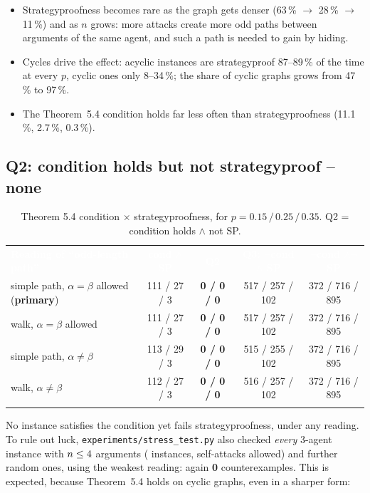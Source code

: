\documentclass[10pt,a4paper]{article}
\newcommand{\thd}[1]{\textcolor{white}{\sffamily\bfseries #1}}
\newcommand{\code}[1]{\textcolor{brand!85!black}{\texttt{#1}}}
\newcommand{\tabend}{\arrayrulecolor{brand}\specialrule{0.8pt}{0pt}{0pt}\arrayrulecolor{black}}
\begin{document}
\begin{keybox}[Q1 -- findings]
\begin{itemize}
  \item Strategyproofness becomes rare as the graph gets denser (63\,\% $\to$ 28\,\% $\to$ 11\,\%) and as $n$ grows: more
        attacks create more odd paths between arguments of the same agent, and such a path is needed to gain by hiding.
  \item Cycles drive the effect: acyclic instances are strategyproof 87--89\,\% of the time at every $p$, cyclic ones only
        8--34\,\%; the share of cyclic graphs grows from 47\,\% to 97\,\%.
  \item The Theorem~5.4 condition holds far less often than strategyproofness (11.1\,\%, 2.7\,\%, 0.3\,\%).
\end{itemize}
\end{keybox}

\subsection{Q2: condition holds but not strategyproof -- none}\label{sec:q2}

\begin{table}[H]\centering
\caption{Theorem 5.4 condition $\times$ strategyproofness, for $p = 0.15\,/\,0.25\,/\,0.35$. Q2 = condition holds $\wedge$ not SP.}\label{tab:q2}
\small
\begin{tabularx}{\textwidth}{>{\raggedright\arraybackslash}X c c c c}
\rowcolor{brand}\thd{Reading of ``odd-length path''} & \thd{cond $\wedge$ SP} & \thd{\textbf{Q2}} & \thd{Q3: $\neg$cond $\wedge$ SP} & \thd{$\neg$cond $\wedge\neg$SP}\\
\rowcolor{ennbg} simple path, $\alpha=\beta$ allowed (\textbf{primary}) & 111 / 27 / 3 & \textbf{0 / 0 / 0} & 517 / 257 / 102 & 372 / 716 / 895\\
\rowcolor{white} walk, $\alpha=\beta$ allowed & 111 / 27 / 3 & \textbf{0 / 0 / 0} & 517 / 257 / 102 & 372 / 716 / 895\\
\rowcolor{rowalt} simple path, $\alpha\ne\beta$ & 113 / 29 / 3 & \textbf{0 / 0 / 0} & 515 / 255 / 102 & 372 / 716 / 895\\
\rowcolor{white} walk, $\alpha\ne\beta$ & 112 / 27 / 3 & \textbf{0 / 0 / 0} & 516 / 257 / 102 & 372 / 716 / 895\\
\tabend
\end{tabularx}
\end{table}

No instance satisfies the condition yet fails strategyproofness, under any reading. To rule out luck,
\code{experiments/stress\_test.py} also checked \emph{every} 3-agent instance with $n\le4$ arguments
(\StressExTotal{} instances, self-attacks allowed) and \StressRandTotal{} further random ones, using the weakest reading: again
\textbf{0} counterexamples. This is expected, because Theorem~5.4 holds on cyclic graphs, even in a sharper form:
\end{document}

